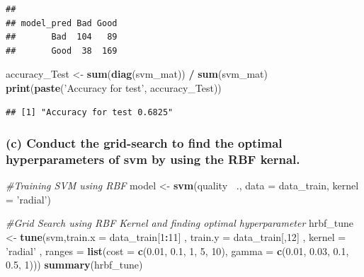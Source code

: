 \documentclass[]{article}
\newenvironment{Shaded}{\begin{snugshade}}{\end{snugshade}}
\newcommand{\CommentTok}[1]{\textcolor[rgb]{0.56,0.35,0.01}{\textit{#1}}}
\newcommand{\DataTypeTok}[1]{\textcolor[rgb]{0.13,0.29,0.53}{#1}}
\newcommand{\DecValTok}[1]{\textcolor[rgb]{0.00,0.00,0.81}{#1}}
\newcommand{\FloatTok}[1]{\textcolor[rgb]{0.00,0.00,0.81}{#1}}
\newcommand{\KeywordTok}[1]{\textcolor[rgb]{0.13,0.29,0.53}{\textbf{#1}}}
\newcommand{\NormalTok}[1]{#1}
\newcommand{\OperatorTok}[1]{\textcolor[rgb]{0.81,0.36,0.00}{\textbf{#1}}}
\newcommand{\StringTok}[1]{\textcolor[rgb]{0.31,0.60,0.02}{#1}}
\begin{document}
\begin{verbatim}
##           
## model_pred Bad Good
##       Bad  104   89
##       Good  38  169
\end{verbatim}

\begin{Shaded}
\begin{Highlighting}[]
\NormalTok{accuracy_Test <-}\StringTok{ }\KeywordTok{sum}\NormalTok{(}\KeywordTok{diag}\NormalTok{(svm_mat)) }\OperatorTok{/}\StringTok{ }\KeywordTok{sum}\NormalTok{(svm_mat)}
\KeywordTok{print}\NormalTok{(}\KeywordTok{paste}\NormalTok{(}\StringTok{'Accuracy for test'}\NormalTok{, accuracy_Test))}
\end{Highlighting}
\end{Shaded}

\begin{verbatim}
## [1] "Accuracy for test 0.6825"
\end{verbatim}

\hypertarget{c-conduct-the-grid-search-to-find-the-optimal-hyperparameters-of-svm-by-using-the-rbf-kernal.}{%
\subsubsection{(c) Conduct the grid-search to find the optimal
hyperparameters of svm by using the RBF
kernal.}\label{c-conduct-the-grid-search-to-find-the-optimal-hyperparameters-of-svm-by-using-the-rbf-kernal.}}

\begin{Shaded}
\begin{Highlighting}[]
\CommentTok{#Training SVM using RBF}
\NormalTok{model <-}\StringTok{ }\KeywordTok{svm}\NormalTok{(quality }\OperatorTok{~}\NormalTok{., }\DataTypeTok{data =}\NormalTok{ data_train,  }\DataTypeTok{kernel =} \StringTok{'radial'}\NormalTok{)}

\CommentTok{#Grid Search using RBF Kernel and finding optimal hyperparameter}
\NormalTok{hrbf_tune <-}\StringTok{ }\KeywordTok{tune}\NormalTok{(svm,}\DataTypeTok{train.x =}\NormalTok{ data_train[}\DecValTok{1}\OperatorTok{:}\DecValTok{11}\NormalTok{] , }\DataTypeTok{train.y =}\NormalTok{ data_train[,}\DecValTok{12}\NormalTok{] ,}
               \DataTypeTok{kernel =} \StringTok{'radial'}\NormalTok{  ,}
               \DataTypeTok{ranges =} \KeywordTok{list}\NormalTok{(}\DataTypeTok{cost =} \KeywordTok{c}\NormalTok{(}\FloatTok{0.01}\NormalTok{, }\FloatTok{0.1}\NormalTok{, }\DecValTok{1}\NormalTok{, }\DecValTok{5}\NormalTok{, }\DecValTok{10}\NormalTok{), }\DataTypeTok{gamma =} \KeywordTok{c}\NormalTok{(}\FloatTok{0.01}\NormalTok{, }\FloatTok{0.03}\NormalTok{, }\FloatTok{0.1}\NormalTok{, }\FloatTok{0.5}\NormalTok{, }\DecValTok{1}\NormalTok{)))}
\KeywordTok{summary}\NormalTok{(hrbf_tune)}
\end{Highlighting}
\end{Shaded}
\end{document}
